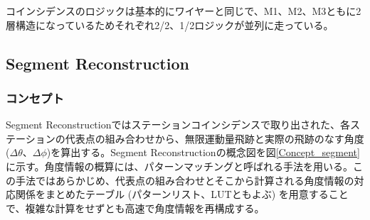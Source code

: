 コインシデンスのロジックは基本的にワイヤーと同じで、M1、M2、M3ともに2層構造になっているためそれぞれ2/2、1/2ロジックが並列に走っている。


\subsection{Segment Reconstruction}
\label{subsec:segment_reco}
\subsubsection*{コンセプト}
Segment Reconstructionではステーションコインシデンスで取り出された、各ステーションの代表点の組み合わせから、無限運動量飛跡と実際の飛跡のなす角度 ($\Delta\theta$、$\Delta\phi$)を算出する。Segment Reconstructionの概念図を図\ref{Concept_segment}に示す。角度情報の概算には、パターンマッチングと呼ばれる手法を用いる。この手法ではあらかじめ、代表点の組み合わせとそこから計算される角度情報の対応関係をまとめたテーブル (パターンリスト、LUTともよぶ) を用意することで、複雑な計算をせずとも高速で角度情報を再構成する。

